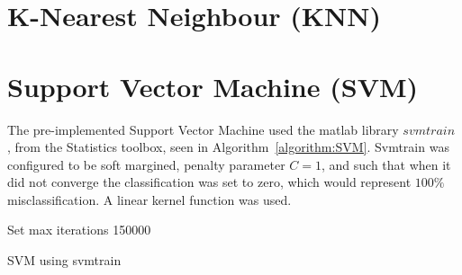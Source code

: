 \section{K-Nearest Neighbour (KNN)}


\section{Support Vector Machine (SVM)}
The pre-implemented Support Vector Machine used the matlab library $svmtrain$ \citep{svmtrain_ref}, from the Statistics toolbox, seen in Algorithm~\ref{algorithm:SVM}.  Svmtrain was configured to be soft margined, penalty parameter $C = 1$, and such that when it did not converge the classification was set to zero, which would represent $100\%$ misclassification. A linear kernel function was used. \\
\begin{algorithm}[H]
\SetAlgoLined
{}

Set max iterations 150000 \\
 \caption{SVM using svmtrain}
 \label{algorithm:SVM}
\end{algorithm}

